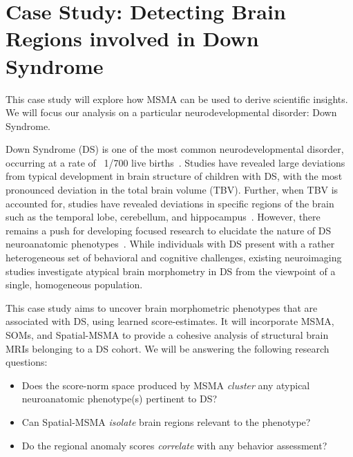 \section{Case Study: Detecting Brain Regions involved in Down Syndrome}

This case study will explore how MSMA can be used to derive scientific insights. We will focus our analysis on a particular neurodevelopmental disorder: Down Syndrome. 


Down Syndrome (DS) is one of the most common neurodevelopmental disorder, occurring at a rate of ~1/700 live births~\cite{parker2010updated}. Studies have revealed large deviations from typical development in brain structure of children with DS, with the most pronounced deviation in the total brain volume (TBV). Further, when TBV is accounted for, studies have revealed deviations in specific regions of the brain such as the temporal lobe, cerebellum, and hippocampus~\cite{hamnerPediatricBrainDevelopment2018}. However, there remains a push for developing focused research to elucidate the nature of DS neuroanatomic phenotypes~\cite{hamnerPediatricBrainDevelopment2018}. While individuals with DS present with a rather heterogeneous set of behavioral and cognitive challenges, existing neuroimaging studies investigate atypical brain morphometry in DS from the viewpoint of a single, homogeneous population.

This case study aims to uncover brain morphometric phenotypes that are associated with DS, using learned score-estimates. It will incorporate MSMA, SOMs, and Spatial-MSMA to provide a cohesive analysis of structural brain MRIs belonging to a DS cohort. We will be answering the following research questions:

\begin{itemize}
    \item Does the score-norm space produced by MSMA \textit{cluster} any atypical neuroanatomic phenotype(s) pertinent to DS?
    
    \item Can Spatial-MSMA \textit{isolate} brain regions relevant to the phenotype?
    
    \item Do the regional anomaly scores \textit{correlate} with any behavior assessment?
\end{itemize}


